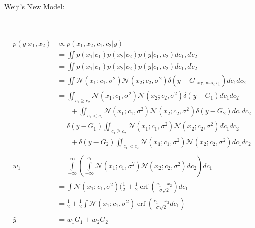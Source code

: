 \documentclass[12pt]{article}
\DeclareMathOperator*{\argmax}{arg\,max}
\DeclareMathOperator*{\erf}{erf}
\begin{document}
Weiji's New Model:
\\
\\
\\
\begin{equation}
\begin{aligned}
p(y|x_1, x_2) & \propto p(x_1, x_2, c_1, c_2 | y)\\
& = \iint p(x_1|c_1) p(x_2|c_2) p(y | c_1, c_2) d c_1, d c_2 \\
& = \iint p(x_1|c_1) p(x_2|c_2) p(y | c_1, c_2) d c_1, d c_2 \\
& = \iint \mathcal{N}(x_1; c_1, \sigma^2) \mathcal{N}(x_2; c_2, \sigma^2) \delta(y - G_{\argmax_i c_i}) dc_1 dc_2 \\
& = \iint_{c_1 \geq c_2} \mathcal{N}(x_1; c_1, \sigma^2) \mathcal{N}(x_2; c_2, \sigma^2) \delta(y - G_1) dc_1 dc_2 \\
& \phantom{{}=1} + \iint_{c_1 < c_2} \mathcal{N}(x_1; c_1, \sigma^2) \mathcal{N}(x_2; c_2, \sigma^2) \delta(y - G_2) dc_1 dc_2\\
& = \delta(y - G_1) \iint_{c_1 \geq c_2} \mathcal{N}(x_1; c_1, \sigma^2) \mathcal{N}(x_2; c_2, \sigma^2) dc_1 dc_2\\
& \phantom{{}=1} + \delta(y - G_2) \iint_{c_1 < c_2} \mathcal{N}(x_1; c_1, \sigma^2) \mathcal{N}(x_2; c_2, \sigma^2) dc_1 dc_2\\
\\
w_1 & = \int\limits_{-\infty}^{\infty}(\int\limits_{-\infty}^{c_1} \mathcal{N}(x_1; c_1, \sigma^2) \mathcal{N}(x_2; c_2, \sigma^2) dc_2) dc_1\\
& = \int \mathcal{N}(x_1; c_1, \sigma^2) (\frac{1}{2} + \frac{1}{2} \erf (\frac{c_1 - x_2}{\sigma \sqrt{2}}) dc_1\\
& = \frac{1}{2} + \frac{1}{2}\int \mathcal{N}(x_1; c_1, \sigma^2) \erf (\frac{c_1 - x_2}{\sigma \sqrt{2}} d c_1)\\
\\
\hat{y} & = w_1G_1 + w_2G_2
\end{aligned}
\end{equation}
\end{document}
